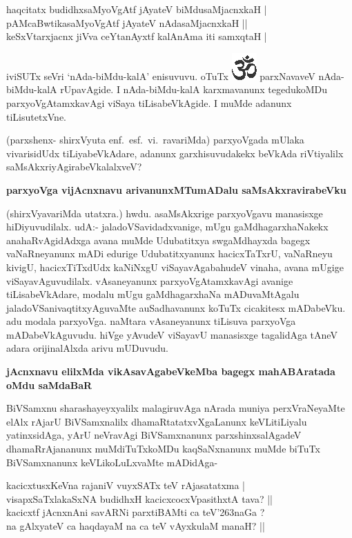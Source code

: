 \begin{shloka}
haqcitatx budidhxsaMyoVgAtf jAyateV biMdusaMjacnxkaH |\\\label{161}
pAMcaBwtikasaMyoVgAtf jAyateV nAdasaMjacnxkaH ||\\
keSxVtarxjacnx jiVva ceYtanAyxtf kalAnAma iti samxqtaH |
\end{shloka}

\noindent
iviSUTx seVri `nAda-biMdu-kalA' enisuvuvu. oTuTx {\includegraphics[scale=.6]{om.eps}} parxNavaveV nAda-biMdu\break-kalA rUpa\-vAgide. I nAda-\-biMdu\--kalA karxmavanunx tegedukoMDu parxyoV\-gAtamxka\-vAgi viSaya tiLisabeVkA\-gide. I muMde adanunx tiLisutetxVne.

(parxshenx- shirxVyuta enf.~esf.~vi.~ravariMda) parxyoVgada mUlaka vivarisidUdx tiLiyabeVkA\-dare, adanunx garxhisuvudakekx beVkAda riVtiyalilx saMsAkxriyAgira\break\-beVkalalxveV?

{\bigskip
\noindent
{\large\bf parxyoVga vijAcnxnavu arivanunxMTumADalu saMsAkxravirabeVku}}
\medskip

\noindent
(shirxVyavariMda utatxra.) hwdu. asaMsAkxrige parxyoVgavu manasisxge hiDiyuvudilalx. udA:- jala\-doVSavidadxvanige, mUgu gaMdhagarxhaNakekx anahaRvAgidAdxga avana muMde Udubatitxya swgaM\-dhayxda bagegx vaNaRneyanunx mADi edurige Udubatitxyanunx hacicxTaTxrU, vaNaRneyu kivigU, hacicx\-TiTxdUdx kaNiNxgU viSayavAgabahudeV vinaha, avana mUgige viSayavAguvudilalx. vAsaneyanunx parxyoV\-gAtamxkavAgi avanige tiLisabeVkAdare, modalu mUgu gaMdhagarxhaNa mADuvaMtAgalu jaladoVSa\-nivaqtitx\-yAguvaMte auSadhavanunx koTuTx cicakitesx mADabeVku. adu modala parxyoVga. naMtara vAsane\-yanunx tiLisuva parxyoVga mADabeVkAguvudu. hiVge yAvudeV viSayavU manasisxge tagalidAga tAneV adara orijinalAlxda arivu mUDuvudu.

{\bigskip
\noindent
{\large\bf jAcnxnavu elilxMda vikAsavAgabeVkeMba bagegx mahABAratada oMdu saMdaBaR}}\label{page162}
\medskip

\noindent
BiVSamxnu sharashayeyxyalilx malagiruvAga nArada muniya perxVraNeyaMte elAlx rAjarU BiVSamx\-nalilx dhamaRtatatxvXgaLanunx keVLitiLiyalu yatinxsidAga, yArU neVravAgi BiVSamxnanunx parxshinxsalAgadeV dhamaR\-rAja\-nanunx muMdiTuTxkoMDu kaqSaNxnanunx muMde biTuTx BiVSamxnanunx keVLikoLuLxvaMte mADidAga-

\begin{shloka}
kacicxtusxKeVna rajaniV vuyxSATx teV rAjasatatxma |\\\label{162}
visapxSaTxlakaSxNA budidhxH kacicxcocxVpasithxtA tava? ||\\
kacicxtf jAcnxnAni savARNi parxtiBAMti ca teV\char'263naGa ?\\
na gAlxyateV ca haqdayaM na ca teV vAyxkulaM manaH? ||
\end{shloka} 

